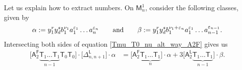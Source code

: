 \documentclass[pdftex]{sigma}
\numberwithin{equation}{section}
\begin{document}
\begin{rem} Let us explain how to extract numbers.
On $\mathsf{M}^1_{n}$, consider the following classes, given by
\[ \alpha := y_1^{r} y_d^{s}b_1^{\nu_1} a_1^{\varepsilon_1} \dots a_n^{\varepsilon_n}
\qquad \textnormal{and} \qquad \beta := y_1^{r} y_d^{s}b_1^{\nu_1+ \varepsilon_n}
a_1^{\varepsilon_1} \dots a_{n-1}^{\varepsilon_{n-1}}.\]
Intersecting both sides of equation \eqref{Tmu_T0_nu_alt_way_A2F} gives us
\begin{align*}%
\bigl[\mathsf{A}_2^{\mathsf{F}} \underbrace{\mathsf{T}_{1} \dots \mathsf{T}_{1}}_{n-1} \mathsf{T}_{0} \mathsf{T}_0\bigr]
\cdot \bigl[\Delta_{n, {n+1}}^{\mathsf{L}}\bigr]\cdot \alpha
& = \bigl[\mathsf{A}_2^{\mathsf{F}} \underbrace{\mathsf{T}_{1} \dots\mathsf{T}_{1}}_n\bigr] \cdot \alpha
+ 3 \bigl[\mathsf{A}_2^{\mathsf{L}} \underbrace{ \mathsf{T}_{1} \dots \mathsf{T}_{1}}_{n-1}\bigr]
\cdot \beta.
\end{align*}
\end{rem}
\end{document}
